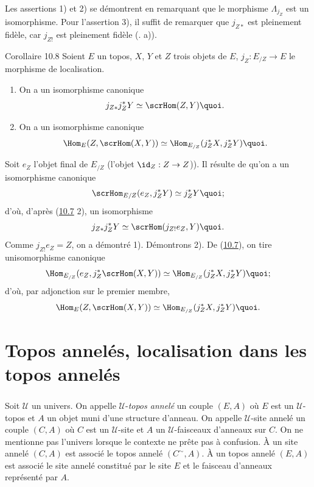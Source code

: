 Les assertions 1) et 2) se démontrent en remarquant que le morphisme
$\Lambda_{j_Z}$ est un isomorphisme. Pour l'assertion 3), il suffit
de remarquer que $j_{Z\ast}$ est pleinement fidèle, car $j_{Z!}$ est
pleinement fidèle (. a)).

\begin{enonce*}{Corollaire 10.8}
Soient $E$ un topos, $X$, $Y$ et $Z$ trois objets de $E$,
$j_Z:E_{/Z}\rightarrow E$ le morphisme de localisation.
\begin{enumerate}
\renewcommand{\labelenumi}{\theenumi)}
\item On a un isomorphisme canonique
$$
j_{Z\ast}j^{\ast}_ZY\simeq \scrHom(Z,Y){\quoi}.
$$

\item On a un isomorphisme canonique
$$
\Hom_E(Z,\scrHom(X,Y))\simeq \Hom_{E_{/Z}}(j^{\ast}_ZX,
j^{\ast}_ZY){\quoi}.
$$
\end{enumerate}
\end{enonce*}

Soit $e_Z$ l'objet final de $E_{/Z}$ (\ie l'objet
$\id_Z:Z\rightarrow Z$)). Il résulte de  qu'on a un
isomorphisme canonique
$$
\scrHom_{E/Z}(e_Z, j^{\ast}_ZY)\simeq j^{\ast}_ZY{\quoi};
$$
d'où, d'après (\hyperref[IV.cor10.7]{10.7} 2), un isomorphisme
$$
j_{Z\ast}j^{\ast}_Z Y\simeq \scrHom(j_{Z!}e_Z, Y){\quoi.}
$$
Comme $j_{Z!}e_Z=Z$, on a démontré 1). Démontrons 2). De
(\hyperref[IV.cor10.7]{10.7}), on tire un\pageoriginale isomorphisme canonique
$$
\Hom_{E_{/Z}}(e_Z, j^{\ast}_Z\scrHom(X,Y))\simeq
\Hom_{E_{/Z}}(j^{\ast}_Z X, j^{\ast}_ZY){\quoi};
$$
d'où, par adjonction sur le premier membre,
$$
\Hom_E(Z,\scrHom(X,Y))\simeq \Hom_{E_{/Z}}(j^{\ast}_ZX,
j^{\ast}_ZY){\quoi}.
$$

\section{Topos annelés, localisation dans les topos annelés}

\setcounter{subsection}{1} \setcounter{subsubsection}{0}
\subsubsection{}
Soit $𝒰$ un univers. On appelle $𝒰$-\emph{topos
annelé} un couple $(E,A)$ où $E$ est un $𝒰$-topos et $A$ un
objet muni d'une structure d'anneau. On appelle $𝒰$-site
annelé un couple $(C,A)$ où $C$ est un $𝒰$-site et $A$ un
$𝒰$-faisceaux d'anneaux sur $C$. On ne mentionne pas
l'univers lorsque le contexte ne prête pas à confusion. À un site
annelé $(C,A)$ est associé le topos annelé $(C^{\sim},A)$. À un
topos annelé $(E,A)$ est associé le site annelé
constitué par le
site $E$ et le faisceau d'anneaux représenté par $A$.

